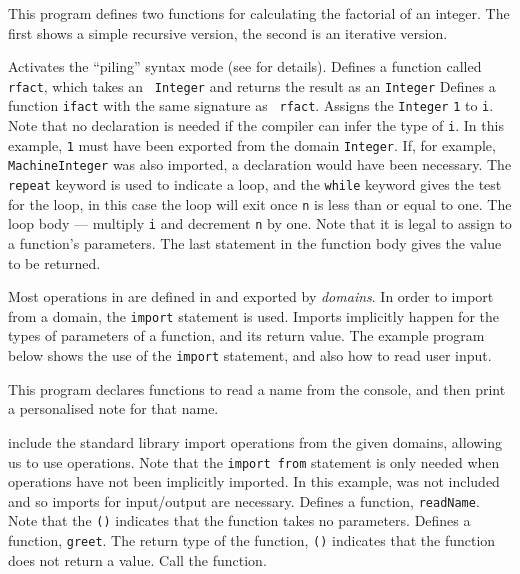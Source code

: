 
This program defines two functions for calculating the factorial of an
integer. The first shows a simple recursive version, the second is
an iterative version. 
\begin{description}
 Activates the ``piling'' syntax mode (see  for details).
 Defines a function called {\tt rfact}, which takes an {\tt
Integer} and returns the result as an {\tt Integer}
 Defines a function {\tt ifact} with the same signature as {\tt
rfact}. 
 Assigns the \verb"Integer" \verb"1"
to {\tt i}. Note that no declaration is
needed if the compiler can infer the type of {\tt i}.
In this example, \verb"1"
must have been exported from the domain {\tt Integer}. If, for example,
{\tt MachineInteger} was also imported, a declaration would have been
necessary.
 The {\tt repeat} keyword is used to indicate a loop, and the
{\tt while} keyword gives the test for the loop, in this case the loop
will exit once {\tt n} is less than or equal to one.
 The loop body --- multiply {\tt i} and decrement {\tt n} by
one. Note that it is legal to assign to a function's parameters.
 The last statement in the function body gives the value to
be returned.
\end{description}

\newpage

Most operations in \asharp{} are defined in and exported by {\em
domains}. In order to import from a domain,
the {\tt import} statement is used. Imports implicitly happen for the
types of parameters of a function, and its return value. The example
program below shows the use of the {\tt import} statement, and also
how to read user input.


This program declares functions to read a name from the console, and
then print a personalised note for that name. 
\begin{description}
 include the standard library
 import operations from the given domains, allowing us
to use operations. Note that the {\tt import from} statement is only
needed when operations have not been implicitly imported. In this example,
 was not included and so imports for input/output are
necessary.
 Defines a function, {\tt readName}. Note that the {\tt ()}
indicates that the function takes no parameters.
 Defines a function, {\tt greet}. The return type of the
function, {\tt ()} indicates that the function does not return a
value.
 Call the function.
\end{description}

